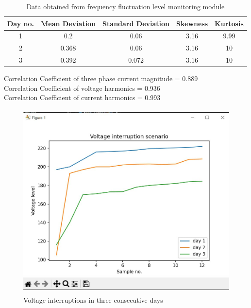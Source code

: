 \documentclass[a4paper,12pt,oneside]{book}
\begin{document}
\begin{table}[h!]
  \centering
  \caption{Data obtained from frequency fluctuation level monitoring module}
  \begin{tabular}{|c|c|c|c|c|}
  \hline
  \textbf{Day no.} & \textbf{Mean Deviation} & \textbf{Standard Deviation} & \textbf{Skewness} & \textbf{Kurtosis} \\
  \hline
  1 & 0.2 & 0.06 & 3.16 & 9.99 \\
  2 & 0.368 & 0.06 & 3.16 & 10 \\
  3 & 0.392 & 0.072 & 3.16 & 10 \\
  \hline
  \end{tabular}
  \label{tab:frequency-fluctuation}
  \end{table}

  Correlation Coefficient of three phase current magnitude = 0.889\\
  Correlation Coefficient of voltage harmonics = 0.936\\
  Correlation Coefficient of current harmonics = 0.993

  \newpage
  \begin{figure}[h!]
    \centering
    \includegraphics[height=10cm]{Figures/3.jpg} 
    \caption{Voltage interruptions in three consecutive days}
    \label{fig:voltage-interruptions}
  \end{figure}
\end{document}
